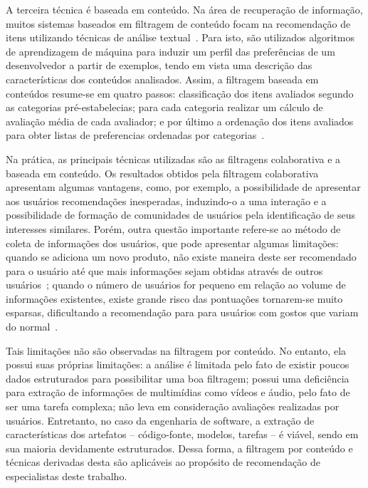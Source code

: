 \documentclass[oneside,brazil,a4paper]{normas-utf-tex}
\begin{document}
A terceira técnica é baseada em conteúdo. Na área de recuperação de informação, muitos sistemas baseados em filtragem de conteúdo focam na recomendação de itens utilizando técnicas de análise textual~\cite{silvio-etal:2010}. Para isto, são utilizados algoritmos de aprendizagem de máquina para induzir um perfil das preferências de um desenvolvedor a partir de exemplos, tendo em vista uma descrição das características dos conteúdos analisados. Assim, a filtragem baseada em conteúdos resume-se em quatro passos: classificação dos itens avaliados segundo as categorias pré-estabelecias; para cada categoria realizar um cálculo de avaliação média de cada avaliador; e por último a ordenação dos itens avaliados para obter listas de preferencias ordenadas por categorias~\cite{Motta-etal:2011}.

Na prática, as principais técnicas utilizadas são as filtragens colaborativa e a baseada em conteúdo. Os resultados obtidos pela filtragem colaborativa apresentam algumas vantagens, como, por exemplo, a possibilidade de apresentar aos usuários recomendações inesperadas, induzindo-o a uma interação e a possibilidade de formação de comunidades de usuários pela identificação de seus interesses similares. Porém, outra questão importante refere-se ao método de coleta de informações dos usuários, que pode apresentar algumas limitações: quando se adiciona um novo produto, não existe maneira deste ser recomendado para o usuário até que mais informações sejam obtidas através de outros usuários~\cite{silvio-etal:2010}; quando o número de usuários for pequeno em relação ao volume de informações existentes, existe grande risco das pontuações tornarem-se muito esparsas, dificultando a recomendação para para usuários com gostos que variam do normal~\cite{Motta-etal:2011}.

Tais limitações não são observadas na filtragem por conteúdo. No entanto, ela possui suas próprias limitações: a análise é limitada pelo fato de existir poucos dados estruturados para possibilitar uma boa filtragem; possui uma deficiência para extração de informações de multimídias como vídeos e áudio, pelo fato de ser uma tarefa complexa; não leva em consideração avaliações realizadas por usuários. Entretanto, no caso da engenharia de software, a extração de características dos artefatos -- código-fonte, modelos, tarefas -- é viável, sendo em sua maioria devidamente estruturados. Dessa forma, a filtragem por conteúdo e técnicas derivadas desta são aplicáveis ao propósito de recomendação de especialistas deste trabalho.
\end{document}
